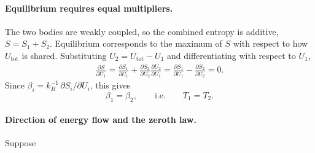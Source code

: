 \paragraph{Equilibrium requires equal multipliers.}
The two bodies are weakly coupled, so the combined entropy is additive,
$S=S_1+S_2$. Equilibrium corresponds to the maximum of $S$ with respect to
how $U_{\text{tot}}$ is shared. Substituting $U_2=U_{\text{tot}}-U_1$ and
differentiating with respect to $U_1$,
\begin{align*}
    \frac{\partial S}{\partial U_1}
    = \frac{\partial S_1}{\partial U_1}
    +\frac{\partial S_2}{\partial U_2}\frac{\partial U_2}{\partial U_1}
    = \frac{\partial S_1}{\partial U_1}-\frac{\partial S_2}{\partial U_2}=0.
\end{align*}
Since $\beta_i=k_B^{-1}\,\partial S_i/\partial U_i$, this gives
\begin{equation}
    \boxed{\beta_1=\beta_2, \qquad\text{i.e.}\qquad T_1=T_2.}
\end{equation}

\paragraph{Direction of energy flow and the zeroth law.}
Suppose